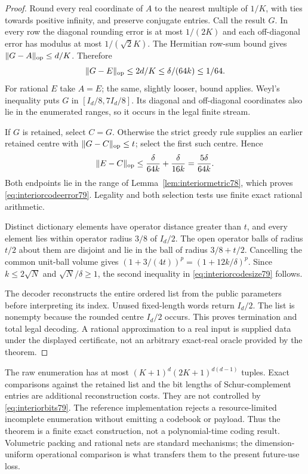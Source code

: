\begin{proof}
Round every real coordinate of $A$ to the nearest multiple of $1/K$,
with ties towards positive infinity, and preserve conjugate entries.
Call the result $G$.  In every row the diagonal rounding error is at
most $1/(2K)$ and each off-diagonal error has modulus at most
$1/(\sqrt2K)$.  The Hermitian row-sum bound gives
$\|G-A\|_{\rm op}\le d/K$.  Therefore
\[
 \|G-E\|_{\rm op}\le2d/K\le\delta/(64k)\le1/64.
\]
For rational $E$ take $A=E$; the same, slightly looser, bound applies.
Weyl's inequality puts $G$ in $[I_d/8,7I_d/8]$.  Its diagonal and
off-diagonal coordinates also lie in the enumerated ranges, so it
occurs in the legal finite stream.

If $G$ is retained, select $C=G$.  Otherwise the strict greedy rule
supplies an earlier retained centre with $\|G-C\|_{\rm op}\le t$;
select the first such centre.  Hence
\[
 \|E-C\|_{\rm op}\le\frac{\delta}{64k}
                            +\frac{\delta}{16k}
                      =\frac{5\delta}{64k}.
\]
Both endpoints lie in the range of Lemma~\ref{lem:interiormetric78},
which proves \eqref{eq:interiorcodeerror79}.  Legality and both
selection tests use finite exact rational arithmetic.

Distinct dictionary elements have operator distance greater than
$t$, and every element lies within operator radius $3/8$ of $I_d/2$.
The open operator balls of radius $t/2$ about them are disjoint and
lie in the ball of radius $3/8+t/2$.  Cancelling the common unit-ball
volume gives $(1+3/(4t))^p=(1+12k/\delta)^p$.  Since
$k\le2\sqrt N$ and $\sqrt N/\delta\ge1$, the second inequality
in \eqref{eq:interiorcodesize79} follows.

The decoder reconstructs the entire ordered list from the public
parameters before interpreting its index.  Unused fixed-length
words return $I_d/2$.  The list is nonempty because the rounded
centre $I_d/2$ occurs.  This proves termination and total legal
decoding.  A rational approximation to a real input is supplied
data under the displayed certificate, not an arbitrary exact-real
oracle provided by the theorem.
\end{proof}

The raw enumeration has at most
$(K+1)^d(2K+1)^{d(d-1)}$ tuples.  Exact comparisons against the
retained list and the bit lengths of Schur-complement entries are
additional reconstruction costs.  They are not controlled by
\eqref{eq:interiorbits79}.  The reference implementation rejects a
resource-limited incomplete enumeration without emitting a codebook
or payload.  Thus the theorem is a finite exact construction, not a
polynomial-time coding result.  Volumetric packing and rational nets
are standard mechanisms; the dimension-uniform operational
comparison is what transfers them to the present future-use loss.

